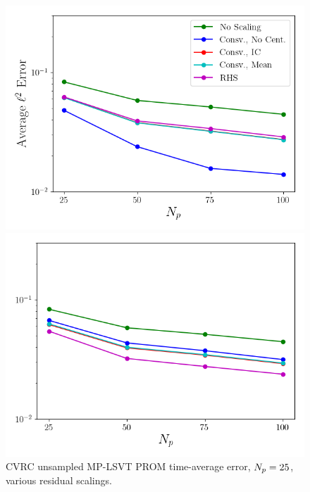 \begin{figure}
	\begin{minipage}{0.49\linewidth}
		\includegraphics[width=0.99\linewidth]{Chapters/BestPractices/Images/errVsModes_norm_l2_Average_errorRaw.png}
	\end{minipage}
	\begin{minipage}{0.49\linewidth}
		\includegraphics[width=0.99\linewidth]{Chapters/BestPractices/Images/errVsModes_norm_minmax_Average_errorRaw.png}
	\end{minipage}
	\caption{\label{fig:resError}CVRC unsampled MP-LSVT PROM time-average error, $N_p = 25$, various residual scalings.}
\end{figure}

